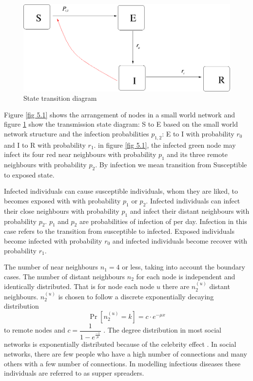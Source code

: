  \begin{figure}[h]
 \centering
 \includegraphics[scale=0.3]{images/swseir.png}
 \caption{State transition diagram} \label{fig 5.2}
\end{figure}
 
 
Figure \ref{fig 5.1} shows the arrangement of nodes in a small world network and figure \ref{fig 5.2} show the transmission state diagram: S to E based on the small world network structure and the infection probabilities $p_ {1,2} $: E to I with probability $r_0$ and I to R with probability $r_1$. in figure \ref{fig 5.1}, the infected green node may infect its four red near neighbours with probability $p_1$ and its three remote neighbours with probability $p_2$. By infection we mean transition from Susceptible to exposed state. 

Infected individuals can cause susceptible individuals, whom they are liked, to becomes exposed with with probability $p_1$ or $p_2$. Infected individuals can  infect their close neighbours with  probability $p_1$ and infect their distant neighbours with probability $p_2$. $p_1 $ and $p_2$ are probabilities of infection of per day. Infection in this case refers to the transition from susceptible to infected. Exposed individuals become infected with probability $r_0$ and infected individuals become recover with probability $r_1$.

The number of near neighbours $n_1 = 4$ or less, taking into account the boundary cases.
The number of distant neighbours $n_2$  for each node is independent and  identically distributed. That is for node each node $u$ there are $n_2^ {(u)} $ distant neighbours. $n_2^ {(u)} $ is chosen to follow a discrete exponentially decaying distribution 
\begin{equation} 
 \Pr[n_2^{(u)} = k] = c \cdot e^{-\mu x  } \label{5.2.1}
 \end{equation}
to remote nodes and $c = \dfrac{1}{1- e^{\frac{-1}{\mu}}}$ \citep{fu2013propagation}. The degree distribution in most social networks is exponentially distributed because of the celebrity effect \citep{estrada2015first}. In social networks, there are few people who have a high number of connections and many others with a few number of connections. In modelling infectious diseases these individuals are referred to as supper spreaders.

